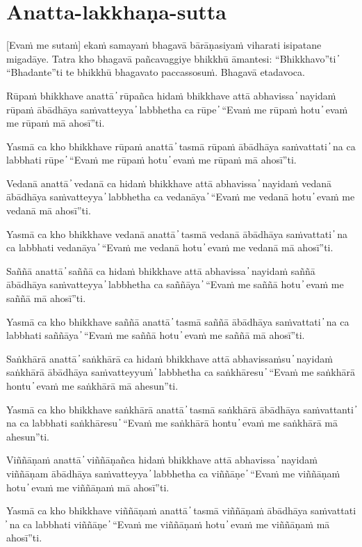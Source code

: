 \section{Anatta-lakkhaṇa-sutta}

[Evaṁ me sutaṁ] ekaṁ samayaṁ bhagavā bārāṇasiyaṁ viharati isipatane migadāye. Tatra kho bhagavā pañcavaggiye bhikkhū āmantesi: “Bhikkhavo”ti  ̓  “Bhadante”ti te bhikkhū bhagavato paccassosuṁ. Bhagavā etadavoca.

Rūpaṁ bhikkhave anattā  ̓  rūpañca hidaṁ bhikkhave attā abhavissa  ̓  nayidaṁ rūpaṁ ābādhāya saṁvatteyya  ̓  labbhetha ca rūpe  ̓  “Evaṁ me rūpaṁ hotu  ̓  evaṁ me rūpaṁ mā ahosī”ti.

Yasmā ca kho bhikkhave rūpaṁ anattā  ̓  tasmā rūpaṁ ābādhāya saṁvattati  ̓  na ca labbhati rūpe  ̓  “Evaṁ me rūpaṁ hotu  ̓  evaṁ me rūpaṁ mā ahosī”ti.

Vedanā anattā  ̓  vedanā ca hidaṁ bhikkhave attā abhavissa  ̓  nayidaṁ vedanā ābādhāya saṁvatteyya  ̓  labbhetha ca vedanāya  ̓  “Evaṁ me vedanā hotu  ̓  evaṁ me vedanā mā ahosī”ti.

Yasmā ca kho bhikkhave vedanā anattā  ̓  tasmā vedanā ābādhāya saṁvattati  ̓  na ca labbhati vedanāya  ̓  “Evaṁ me vedanā hotu  ̓  evaṁ me vedanā mā ahosī”ti.

Saññā anattā  ̓  saññā ca hidaṁ bhikkhave attā abhavissa  ̓  nayidaṁ saññā ābādhāya saṁvatteyya  ̓  labbhetha ca saññāya  ̓  “Evaṁ me saññā hotu  ̓  evaṁ me saññā mā ahosī”ti.

Yasmā ca kho bhikkhave saññā anattā  ̓  tasmā saññā ābādhāya saṁvattati  ̓  na ca labbhati saññāya  ̓  “Evaṁ me saññā hotu  ̓  evaṁ me saññā mā ahosī”ti.

Saṅkhārā anattā  ̓  saṅkhārā ca hidaṁ bhikkhave attā abhavissaṁsu  ̓  nayidaṁ saṅkhārā ābādhāya saṁvatteyyuṁ  ̓  labbhetha ca saṅkhāresu  ̓  “Evaṁ me saṅkhārā hontu  ̓  evaṁ me saṅkhārā mā ahesun”ti.

Yasmā ca kho bhikkhave saṅkhārā anattā  ̓  tasmā saṅkhārā ābādhāya saṁvattanti  ̓  na ca labbhati saṅkhāresu  ̓  “Evaṁ me saṅkhārā hontu  ̓  evaṁ me saṅkhārā mā ahesun”ti.

Viññāṇaṁ anattā  ̓  viññāṇañca hidaṁ bhikkhave attā abhavissa  ̓  nayidaṁ viññāṇam ābādhāya saṁvatteyya  ̓  labbhetha ca viññāṇe  ̓  “Evaṁ me viññāṇaṁ hotu  ̓  evaṁ me viññāṇaṁ mā ahosī”ti.

Yasmā ca kho bhikkhave viññāṇaṁ anattā  ̓  tasmā viññāṇaṁ ābādhāya saṁvattati  ̓  na ca labbhati viññāṇe  ̓  “Evaṁ me viññāṇaṁ hotu  ̓  evaṁ me viññāṇaṁ mā ahosī”ti.

